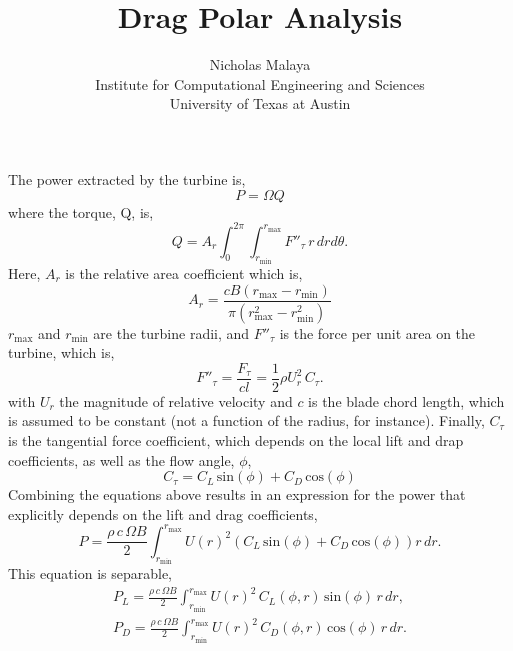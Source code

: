 \documentclass{article}
\title{\bf{Drag Polar Analysis}}
\author{Nicholas Malaya \\ Institute for Computational Engineering and Sciences \\ University of Texas at Austin} \date{}
\begin{document}
\maketitle

\newpage

The power extracted by the turbine is, 
\begin{equation}
 P = \Omega Q
\end{equation}
where the torque, Q, is, 
\begin{equation}
 Q = A_r \int_0^{2\pi} \int_{r_{\text{min}}}^{r_{\text{max}}} F''_{\tau}\, r\, dr d\theta.
\end{equation}
Here, $A_r$ is the relative area coefficient which is, 
\begin{equation}
A_r = \frac{c B (r_{\text{max}}-r_{\text{min}})}{\pi(r_{\text{max}}^2-r_{\text{min}}^2)}
\end{equation}
$r_{\text{max}}$ and $r_{\text{min}}$
are the turbine radii, and $F''_{\tau}$ is the force per unit
area on the turbine, which is, 
\begin{equation}
 F''_{\tau} = \frac{F_{\tau}}{cl}= \frac{1}{2}\rho U_r^2 \, C_{\tau}.
\end{equation}
with $U_r$ the magnitude of relative velocity and $c$ is the blade chord
length, which is assumed to be constant (not a function of the radius,
for instance). Finally, $C_{\tau}$ is the tangential force coefficient,
which depends on the local lift and drap coefficients, as well as the
flow angle, $\phi$, 
\begin{equation}
 C_{\tau} = C_L \,\text{sin}(\phi) + C_D \,\text{cos}(\phi)
\end{equation}
Combining the equations above results in an expression for the power
that explicitly depends on the lift and drag coefficients, 
\begin{equation*}
 P = \frac{\rho\, c\, \Omega B}{2}
  \int_{r_{\text{min}}}^{r_{\text{max}}} U(r)^2 \left(C_L
						     \,\text{sin}(\phi)
						     + C_D
						     \,\text{cos}(\phi)
						    \right) r\,dr. 
\end{equation*}
This equation is separable, 
\begin{align}
 P_L = \frac{\rho\, c\, \Omega B}{2}
  \int_{r_{\text{min}}}^{r_{\text{max}}} U(r)^2 \, C_L(\phi,r)
 \,\text{sin}(\phi)\, r\,dr,  \label{lift} \\
 P_D = \frac{\rho\, c\, \Omega B}{2}
  \int_{r_{\text{min}}}^{r_{\text{max}}} U(r)^2 \, C_D(\phi,r) \,\text{cos}(\phi)\, r\,dr. \label{drag}
\end{align}
\end{document}
